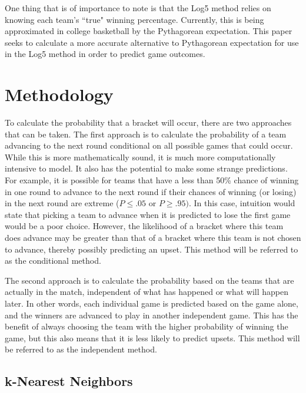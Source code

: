 \documentclass[5p, preprint]{elsarticle}
\begin{document}
One thing that is of importance to note is that the Log5 method relies on knowing each team's ``true" winning percentage. Currently, this is being approximated in college basketball by the Pythagorean expectation. This paper seeks to calculate a more accurate alternative to Pythagorean expectation for use in the Log5 method in order to predict game outcomes.

\vspace*{-.1in}

\section{Methodology}

To calculate the probability that a bracket will occur, there are two approaches that can be taken. The first approach is to calculate the probability of a team advancing to the next round conditional on all possible games that could occur. While this is more mathematically sound, it is much more computationally intensive to model. It also has the potential to make some strange predictions. For example, it is possible for teams that have a less than 50\% chance of winning in one round to advance to the next round if their chances of winning (or losing) in the next round are extreme ($P \leq .05 \mbox{ or }  P \geq .95)$. In this case, intuition would state that picking a team to advance when it is predicted to lose the first game would be a poor choice. However, the likelihood of a bracket where this team does advance may be greater than that of a bracket where this team is not chosen to advance, thereby possibly predicting an upset. This method will be referred to as the conditional method.

The second approach is to calculate the probability based on the teams that are actually in the match, independent of what has happened or what will happen later. In other words, each individual game is predicted based on the game alone, and the  winners are advanced to play in another independent game. This has the benefit of always choosing the team with the higher probability of winning the game, but this also means that it is less likely to predict upsets. This method will be referred to as the independent method.

\vspace*{-.1in}

\subsection*{k-Nearest Neighbors}
\end{document}

